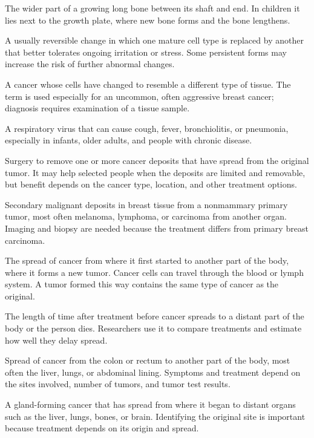  The wider part of a growing long bone between its shaft and end. In children it lies next to the growth plate, where new bone forms and the bone lengthens.

 A usually reversible change in which one mature cell type is replaced by another that better tolerates ongoing irritation or stress. Some persistent forms may increase the risk of further abnormal changes.

 A cancer whose cells have changed to resemble a different type of tissue. The term is used especially for an uncommon, often aggressive breast cancer; diagnosis requires examination of a tissue sample.

 A respiratory virus that can cause cough, fever, bronchiolitis, or pneumonia, especially in infants, older adults, and people with chronic disease.

 Surgery to remove one or more cancer deposits that have spread from the original tumor. It may help selected people when the deposits are limited and removable, but benefit depends on the cancer type, location, and other treatment options.

 Secondary malignant deposits in breast tissue from a nonmammary primary tumor, most often melanoma, lymphoma, or carcinoma from another organ. Imaging and biopsy are needed because the treatment differs from primary breast carcinoma.

 The spread of cancer from where it first started to another part of the body,
where it forms a new tumor. Cancer cells can travel through the blood or lymph system.
A tumor formed this way contains the same type of cancer as the original.

 The length of time after treatment before cancer spreads to a distant part of the body or the person dies. Researchers use it to compare treatments and estimate how well they delay spread.

 Spread of cancer from the colon or rectum to another part of the body, most often the liver, lungs, or abdominal lining. Symptoms and treatment depend on the sites involved, number of tumors, and tumor test results.

 A gland-forming cancer that has spread from where it began to distant organs such as the liver, lungs, bones, or brain. Identifying the original site is important because treatment depends on its origin and spread.

